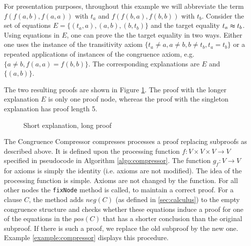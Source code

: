 
\begin{example}
\label{example:shortexpl}
For presentation purposes, throughout this example we will abbreviate the term $f(f(a,b),f(a,a))$ with $t_a$ and $f(f(b,a),f(b,b))$ with $t_b$.
Consider the set of equations $E = \{(t_a,a),(a,b),(b,t_b)\}$ and the target equality $t_a \thickapprox t_b$.
Using equations in $E$, one can prove the the target equality in two ways.
Either one uses the instance of the transitivity axiom $\{t_a \neq a, a \neq b, b \neq t_b, t_a = t_b\}$ or a repeated applications of instances of the congruence axiom, e.g. $\{a \neq b, f(a,a) = f(b,b)\}$.
The corresponding explanations are $E$ and $\{(a,b)\}$.

The two resulting proofs are shown in Figure \ref{fig:short_expl_proof}.
The proof with the longer explanation $E$ is only one proof node, whereas the proof with the singleton explanation has proof length 5.

%
%
%

\begin{figure}[!h]

\caption{Short explanation, long proof}
\label{fig:short_expl_proof}
\end{figure}

\end{example}

The Congruence Compressor compresses processes a proof replacing subproofs as described above. 
It is defined upon the processing function $f: V \times V \times V \rightarrow V$ specified in pseudocode in Algorithm \ref{algo:compressor}.
The function $g_f: V \rightarrow V$ for axioms is simply the identity (i.e. axioms are not modified).
The idea of the processing function is simple.
Axioms are not changed by the function.
For all other nodes the \texttt{fixNode} method is called, to maintain a correct proof.
For a clause $C$, the method adds $neg(C)$ (as defined in \ref{sec:calculus}) to the empty congruence structure and checks whether these equations induce a proof for one of the equations in the $pos(C)$ that has a shorter conclusion than the original subproof.
If there is such a proof, we replace the old subproof by the new one.
Example \ref{example:compressor} displays this procedure.


